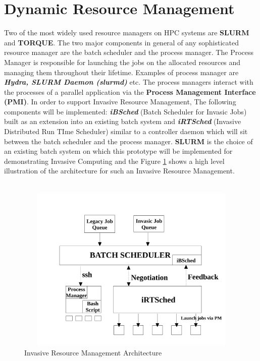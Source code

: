 \section{Dynamic Resource Management}
Two of the most widely used resource managers on HPC systems are \textbf{SLURM} and \textbf{TORQUE}. The two major components in general of any sophisticated resource manager are the batch scheduler and the process manager. The Process Manager is responsible for launching the jobs on the allocated resources and managing them throughout their lifetime. Examples of process manager are \textbf{\textit{Hydra, SLURM Daemon (slurmd)}} etc. The process managers interact with the processes of a parallel application via the \textbf{Process Management Interface (PMI)}. In order to support Invasive Resource Management, The following components will be implemented: \textbf{\textit{iBSched}} (Batch Scheduler for Invasic Jobs) built as an extension into an existing batch system and \textbf{\textit{iRTSched}} (Invasive Distributed Run TIme Scheduler) similar to a controller daemon which will sit between the batch scheduler and the process manager. \textbf{SLURM} is the choice of an existing batch system on which this prototype will be implemented for demonstrating Invasive Computing and the Figure \ref{fig:1} shows a high level illustration of the architecture for such an Invasive Resource Management.\\ \\
\begin{figure}[!htbp]
\centering
\vspace{-0.35in}
\includegraphics[width=1.0\textwidth, height=80mm]{./figures/architecture.pdf}
\caption{Invasive Resource Management Architecture}
\label{fig:1}
\end{figure}
\noindent
